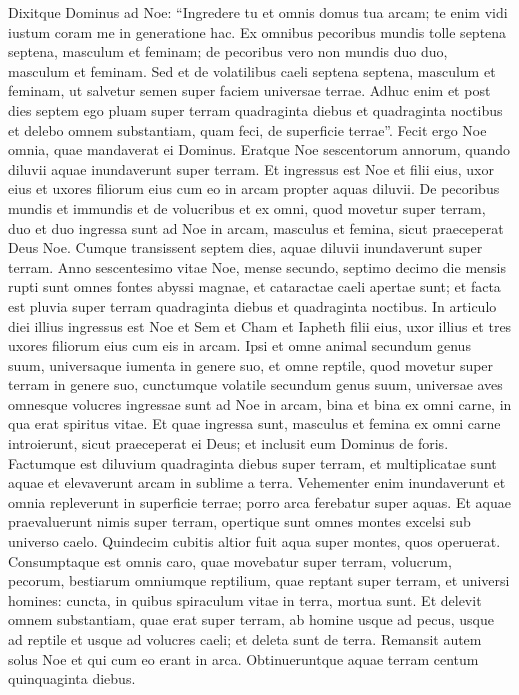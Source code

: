 \begin{biblechapter}  
\verse Dixitque Dominus ad Noe: “Ingredere tu et omnis domus tua arcam; te enim vidi iustum coram me in generatione hac. 
\verse Ex omnibus pecoribus mundis tolle septena septena, masculum et feminam; de pecoribus vero non mundis duo duo, masculum et feminam. 
\verse Sed et de volatilibus caeli septena septena, masculum et feminam, ut salvetur semen super faciem universae terrae. 
\verse Adhuc enim et post dies septem ego pluam super terram quadraginta diebus et quadraginta noctibus et delebo omnem substantiam, quam feci, de superficie terrae”. 
\verse Fecit ergo Noe omnia, quae mandaverat ei Dominus. 
\verse Eratque Noe sescentorum annorum, quando diluvii aquae inundaverunt super terram. 
\verse Et ingressus est Noe et filii eius, uxor eius et uxores filiorum eius cum eo in arcam propter aquas diluvii. 
\verse De pecoribus mundis et immundis et de volucribus et ex omni, quod movetur super terram, 
\verse duo et duo ingressa sunt ad Noe in arcam, masculus et femina, sicut praeceperat Deus Noe. 
\verse Cumque transissent septem dies, aquae diluvii inundaverunt super terram. 
\verse Anno sescentesimo vitae Noe, mense secundo, septimo decimo die mensis rupti sunt omnes fontes abyssi magnae, et cataractae caeli apertae sunt; 
\verse et facta est pluvia super terram quadraginta diebus et quadraginta noctibus. 
\verse In articulo diei illius ingressus est Noe et Sem et Cham et Iapheth filii eius, uxor illius et tres uxores filiorum eius cum eis in arcam. 
\verse Ipsi et omne animal secundum genus suum, universaque iumenta in genere suo, et omne reptile, quod movetur super terram in genere suo, cunctumque volatile secundum genus suum, universae aves omnesque volucres 
\verse ingressae sunt ad Noe in arcam, bina et bina ex omni carne, in qua erat spiritus vitae. 
\verse Et quae ingressa sunt, masculus et femina ex omni carne introierunt, sicut praeceperat ei Deus; et inclusit eum Dominus de foris. 
\verse Factumque est diluvium quadraginta diebus super terram, et multiplicatae sunt aquae et elevaverunt arcam in sublime a terra. 
\verse Vehementer enim inundaverunt et omnia repleverunt in superficie terrae; porro arca ferebatur super aquas. 
\verse Et aquae praevaluerunt nimis super terram, opertique sunt omnes montes excelsi sub universo caelo. 
\verse Quindecim cubitis altior fuit aqua super montes, quos operuerat. 
\verse Consumptaque est omnis caro, quae movebatur super terram, volucrum, pecorum, bestiarum omniumque reptilium, quae reptant super terram, et universi homines:  
\verse cuncta, in quibus spiraculum vitae in terra, mortua sunt. 
\verse Et delevit omnem substantiam, quae erat super terram, ab homine usque ad pecus, usque ad reptile et usque ad volucres caeli; et deleta sunt de terra. Remansit autem solus Noe et qui cum eo erant in arca. 
\verse Obtinueruntque aquae terram centum quinquaginta diebus. 
\end{biblechapter}

